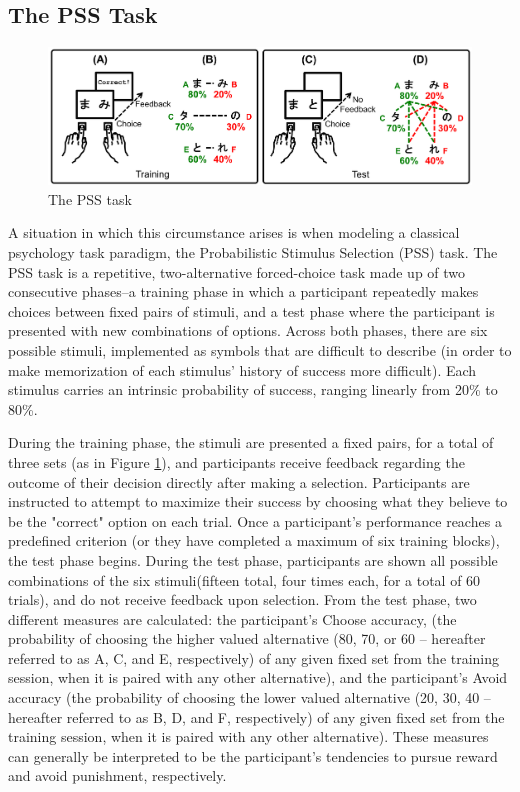 \documentclass[10pt,letterpaper]{article}
\begin{document}
\subsection{The PSS Task}

\begin{figure}[ht]
	\begin{center}
		\includegraphics[width=\textwidth]{pss.png}
	\end{center}
	\caption{The PSS task} 
	\label{pss}
\end{figure}

A situation in which this circumstance arises is when modeling a classical psychology task paradigm, the Probabilistic Stimulus Selection (PSS) task. The PSS task is a repetitive, two-alternative forced-choice task made up of two consecutive phases--a training phase in which a participant repeatedly makes choices between fixed pairs of stimuli, and a test phase where the participant is presented with new combinations of options. Across both phases, there are six possible stimuli, implemented as symbols that are difficult to describe (in order to make memorization of each stimulus’ history of success more difficult). Each stimulus carries an intrinsic probability of success, ranging linearly from 20\% to 80\%.

During the training phase, the stimuli are presented a fixed pairs, for a total of three sets (as in Figure \ref{pss}), and participants receive feedback regarding the outcome of their decision directly after making a selection. Participants are instructed to attempt to maximize their success by choosing what they believe to be the "correct" option on each trial. Once a participant’s performance reaches a predefined criterion (or they have completed a maximum of six training blocks), the test phase begins. During the test phase, participants are shown all possible combinations of the six stimuli(fifteen total, four times each, for a total of 60 trials), and do not receive feedback upon selection. From the test phase, two different measures are calculated: the participant’s Choose accuracy, (the probability of choosing the higher valued alternative (80, 70, or 60 – hereafter referred to as A, C, and E, respectively) of any given fixed set from the training session, when it is paired with any other alternative), and the participant’s Avoid accuracy (the probability of choosing the lower valued alternative (20, 30, 40 – hereafter referred to as B, D, and F, respectively) of any given fixed set from the training session, when it is paired with any other alternative). These measures can generally be interpreted to be the participant’s tendencies to pursue reward and avoid punishment, respectively.
\end{document}
